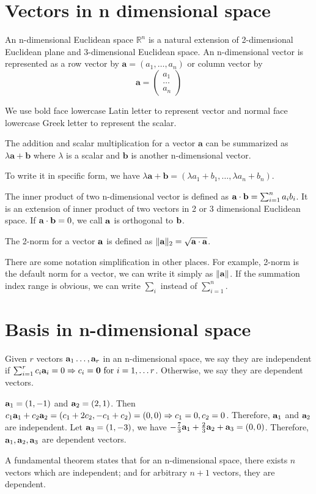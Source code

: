 \section{Vectors in n dimensional space}
An n-dimensional Euclidean space $\mathbb{R}^n$ is a natural extension of 2-dimensional Euclidean plane and 3-dimensional Euclidean space. An n-dimensional vector is represented as a row vector  by $\mathbf{a} = (a_1, \dots, a_n)$ or column vector by 
$$
\mathbf{a} = \begin{pmatrix} a_1 \\ \dots \\ a_n \end{pmatrix}
$$

We use bold face lowercase Latin letter to represent vector and normal face lowercase Greek letter to represent the scalar.

The addition and scalar multiplication for a vector $\mathbf{a}$ can be summarized as $\lambda \mathbf{a} + \mathbf{b}$ where $\lambda$ is a scalar and $\mathbf{b}$ is another n-dimensional vector.

To write it in specific form, we have $\lambda \mathbf{a} + \mathbf{b} = (\lambda a_1 + b_1, \dots, \lambda a_n + b_n)$.

The inner product of two n-dimensional vector is defined as $\mathbf{a} \cdot \mathbf{b} = \sum_{i=1}^n a_i b_i$. It is an extension of inner product of two vectors in 2 or 3 dimensional Euclidean space. If $\mathbf{a} \cdot \mathbf{b} = 0 $, we call $\mathbf{a}$ is orthogonal to $\mathbf{b}$.

The 2-norm for a vector $\mathbf{a}$ is defined as $\lVert\mathbf{a}\rVert_2 = \sqrt{\mathbf{a}\cdot \mathbf{a}}$.

There are some notation simplification in other places. For example, 2-norm is the default norm for a vector, we can write it simply as $\lVert\mathbf{a}\rVert$. If the summation index range is obvious, we can write $\sum_{i}$ instead of $\sum_{i=1}^n$.

\section{Basis in n-dimensional space}
Given $r$ vectors $\mathbf{a}_1 \dots, \mathbf{a}_r$ in an n-dimensional space, we say they are independent if $ \sum_{i=1}^r c_i \mathbf{a}_i = 0 \Rightarrow c_i = \mathbf{0} \textrm{ for } i=1,\dots r$.
Otherwise, we say they are dependent vectors.
\begin{example}
$\mathbf{a}_1 = (1, -1)$ and $\mathbf{a}_2 = (2, 1)$. Then $c_1 \mathbf{a}_1 + c_2 \mathbf{a}_2 = (c_1 + 2 c_2, -c_1 + c_2 ) = (0,0) \Rightarrow c_1 = 0, c_2 = 0$. Therefore, $\mathbf{a}_1$ and $\mathbf{a}_2$ are independent. Let $\mathbf{a}_3 = (1, -3)$, we have $-\frac{7}{3} \mathbf{a}_1 + \frac{2}{3} \mathbf{a}_2 + \mathbf{a}_3 = (0,0)$. Therefore, $\mathbf{a}_1, \mathbf{a}_2, \mathbf{a}_3$ are dependent vectors.
\end{example}
A fundamental theorem states that for an n-dimensional space, there exists $n$ vectors which are independent; and for arbitrary $n+1$ vectors, they are dependent.

